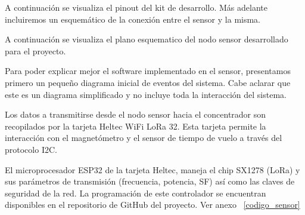 A continuación se visualiza el pinout del kit de desarrollo. Más adelante incluiremos un esquemático de la conexión entre el sensor y la misma.





A continuación se visualiza el plano esquematico del nodo sensor desarrollado para el proyecto.

Para poder explicar mejor el software implementado en el sensor, presentamos primero un pequeño diagrama inicial de eventos del sistema. Cabe aclarar que este es un diagrama simplificado y no incluye toda la interacción del sistema.


Los datos a transmitirse desde el nodo sensor hacia el concentrador son recopilados por la tarjeta Heltec WiFi LoRa 32. Esta tarjeta permite la interacción con el magnetómetro y el sensor de tiempo de vuelo a través del protocolo I2C.

El microprocesador ESP32 de la tarjeta Heltec, maneja el chip SX1278 (LoRa) y sus parámetros de transmisión (frecuencia, potencia, SF) así como las claves de seguridad de la red. La programación de este controlador se encuentran disponibles en el repositorio de GitHub del proyecto. Ver anexo ~\ref{codigo_sensor}

